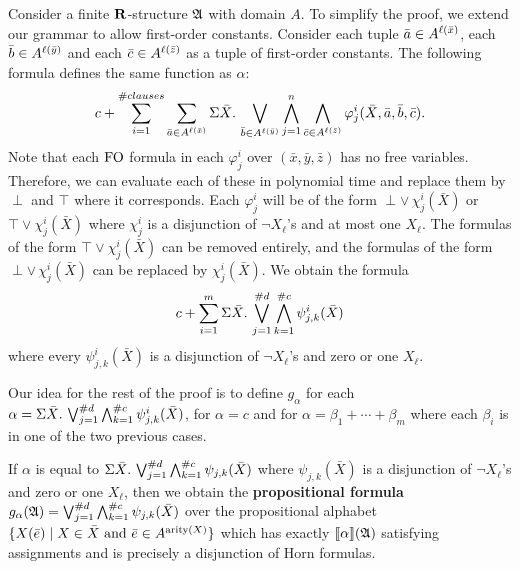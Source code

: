 Consider a finite $\mathbf{R}$-structure $\mathfrak{A}$ with domain $A$. To simplify the proof, we extend our grammar to allow first-order constants. Consider each tuple $\bar{a}\in A^{\ell(\bar{x})}$, each $\bar{b}\in A^{\ell(\bar{y})}$ and each $\bar{c}\in A^{\ell(\bar{z})}$ as a tuple of first-order constants. The following formula defines the same function as $\alpha$:
$$
c + \sum_{i = 1}^{\#clauses} \sum_{\bar{a}\in A^{\ell(\bar{x})}} \Sigma{\bar{X}}.\,\bigvee_{\bar{b}\in A^{\ell(\bar{y})}}\bigwedge_{j = 1}^{n}\bigwedge_{\bar{c}\in A^{\ell(\bar{z})}}\varphi^i_j(\bar{X},\bar{a},\bar{b},\bar{c}).
$$
Note that each ${\rm FO}$ formula in each $\varphi^i_j$ over $(\bar{x},\bar{y},\bar{z})$ has no free variables. Therefore, we can evaluate each of these in polynomial time and replace them by $\perp$ and $\top$ where it corresponds. Each $\varphi^i_j$ will be of the form $\perp \vee\, \chi^i_j(\bar{X})$ or $\top \vee \chi^i_j(\bar{X})$ where $\chi^i_j$ is a disjunction of $\neg X_{\ell}$'s and at most one $X_{\ell}$. The formulas of the form $\top \vee \chi^i_j(\bar{X})$ can be removed entirely, and the formulas of the form $\perp \vee\, \chi^i_j(\bar{X})$ can be replaced by $\chi^i_j(\bar{X})$. We obtain the formula
$$
c + \sum_{i = 1}^{m}\Sigma{\bar{X}}.\,\bigvee_{j = 1}^{\#d}\bigwedge_{k = 1}^{\#c}\psi^{i}_{j,k}(\bar{X})
$$
where every $\psi^{i}_{j,k}(\bar{X})$ is a disjunction of $\neg X_{\ell}$'s and zero or one $X_{\ell}$.

Our idea for the rest of the proof is to define $g_{\alpha}$ for each $\alpha = \Sigma{\bar{X}}.\,\bigvee_{j = 1}^{\#d}\bigwedge_{k = 1}^{\#c}\psi^{i}_{j,k}(\bar{X})$, for $\alpha = c$ and for $\alpha = \beta_1 + \cdots + \beta_m$ where each $\beta_i$ is in one of the two previous cases.

If $\alpha$ is equal to $\Sigma{\bar{X}}.\,\bigvee_{j = 1}^{\#d}\bigwedge_{k = 1}^{\#c}\psi_{j,k}(\bar{X})$ where $\psi_{j,k}(\bar{X})$ is a disjunction of $\neg X_{\ell}$'s and zero or one $X_{\ell}$, then we obtain the {\bf propositional formula} $g_{\alpha}(\mathfrak{A}) = \bigvee_{j = 1}^{\#d}\bigwedge_{k = 1}^{\#c}\psi_{j,k}(\bar{X})$ over the propositional alphabet $\{X(\bar{e}) \mid X \in \bar{X} \text{ and } \bar{e}\in A^{{\rm arity}(X)} \}$ which has exactly ${\llbracket{}{\alpha}\rrbracket}(\mathfrak{A})$ satisfying assignments and is precisely a disjunction of Horn formulas.

